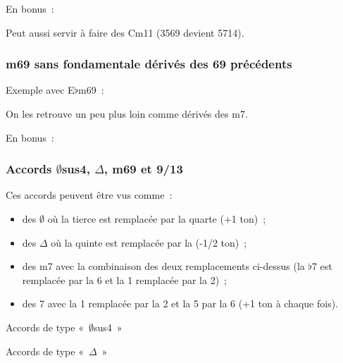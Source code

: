 \documentclass[11pt]{article}
\begin{document}
En bonus :


Peut aussi servir à faire des Cm11 (3569 devient 5714).

\subsubsection{m69 sans fondamentale dérivés des 69 précédents}

Exemple avec E$\flat$m69 :


On les retrouve un peu plus loin comme dérivés des m7.

En bonus :


\subsubsection{Accords $\emptyset$sus4, $\Delta$, m69 et 9/13}

Ces accords peuvent être vus comme :

\begin{itemize}
    \item des $\emptyset$ où la tierce est remplacée par la quarte (+1 ton) ;
    \item des $\Delta$ où la quinte est remplacée par la  (-1/2 ton) ;
    \item des m7 avec la combinaison des deux remplacements ci-dessus (la
        $\flat$7 est remplacée par la 6 et la 1 remplacée par la 2) ;
    \item des 7 avec la 1 remplacée par la 2 et la 5 par la 6 (+1 ton à chaque
        fois).
\end{itemize}

Accords de type «~$\emptyset$sus4~»



Accords de type «~$\Delta$~»

\end{document}
